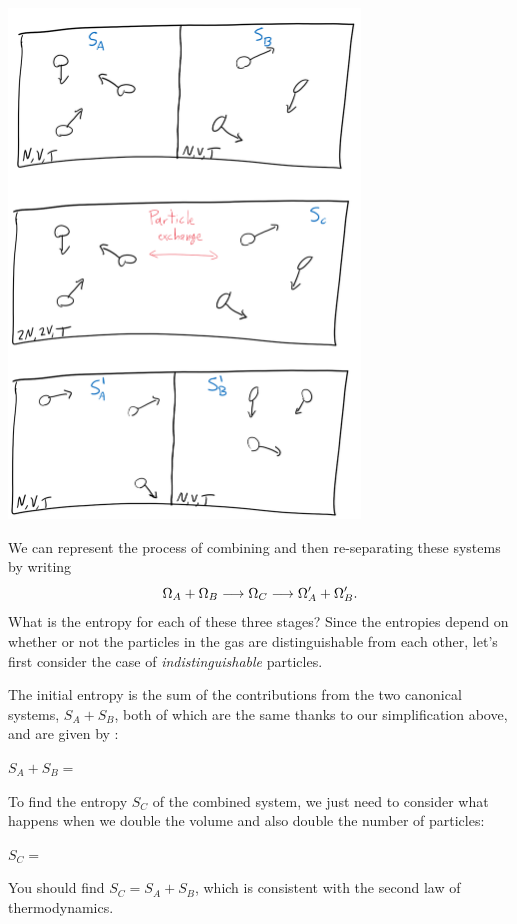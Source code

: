 \begin{center}
  \includegraphics[width=0.7\textwidth]{figs/week04_mixing.pdf}
\end{center}

We can represent the process of combining and then re-separating these systems by writing
\begin{equation*}
  \Omega_A + \Omega_B \longrightarrow \Omega_C \longrightarrow \Omega_A' + \Omega_B'.
\end{equation*}
What is the entropy for each of these three stages?
Since the entropies depend on whether or not the particles in the gas are distinguishable from each other, let's first consider the case of \textit{indistinguishable} particles.

\newpage %
The initial entropy is the sum of the contributions from the two canonical systems, $S_A + S_B$, both of which are the same thanks to our simplification above, and are given by :
\begin{mdframed}
  $\displaystyle S_A + S_B = $ \\[40 pt]
\end{mdframed}
To find the entropy $S_C$ of the combined system, we just need to consider what happens when we double the volume and also double the number of particles:
\begin{mdframed}
  $\displaystyle S_C = $ \\[40 pt]
\end{mdframed}
You should find $S_C = S_A + S_B$, which is consistent with the second law of thermodynamics.


